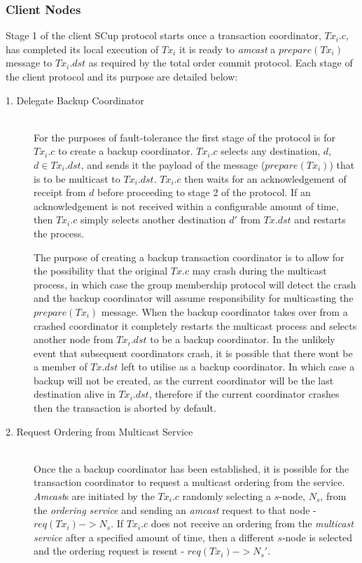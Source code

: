     \subsubsection*{Client Nodes}
    Stage 1 of the client \textsf{SCup} protocol starts once a transaction coordinator, $Tx_i.c$, has completed its local execution of $Tx_i$ it is ready to \emph{amcast} a $prepare(Tx_i)$ message to $Tx_i.dst$ as required by the total order commit protocol.  Each stage of the client protocol and its purpose are detailed below:
    \begin{description}
    
        \item[1. Delegate Backup Coordinator] \hfill \\
        For the purposes of fault-tolerance the first stage of the protocol is for $Tx_i.c$ to create a backup coordinator.  $Tx_i.c$ selects any destination, $d$, $d \in Tx_i.dst$, and sends it the payload of the message ($prepare(Tx_i)$) that is to be multicast to $Tx_i.dst$.  $Tx_i.c$ then waits for an acknowledgement of receipt from $d$ before proceeding to stage 2 of the protocol.  If an acknowledgement is not received within a configurable amount of time, then $Tx_i.c$ simply selects another destination $d'$ from $Tx.dst$ and restarts the process.  
        
        The purpose of creating a backup transaction coordinator is to allow for the possibility that the original $Tx.c$ may crash during the multicast process, in which case the group membership protocol will detect the crash and the backup coordinator will assume responsibility for multicasting the $prepare(Tx_i)$ message.  When the backup coordinator takes over from a crashed coordinator it completely restarts the multicast process and selects another node from $Tx_i.dst$ to be a backup coordinator.  In the unlikely event that subsequent coordinators crash, it is possible that there wont be a member of $Tx.dst$ left to utilise as a backup coordinator.  In which case a backup will not be created, as the current coordinator will be the last destination alive in $Tx_i.dst$, therefore if the current coordinator crashes then the transaction is aborted by default.  
                
        \item[2. Request Ordering from Multicast Service] \hfill \\
        Once the a backup coordinator has been established, it is possible for the transaction coordinator to request a multicast ordering from the service.  \emph{Amcast}s are initiated by the $Tx_i.c$ randomly selecting a $s$-node, $N_s$, from the \emph{ordering service} and sending an \emph{amcast} request to that node - $req(Tx_i) -> N_s$.  If $Tx_i.c$ does not receive an ordering from the \emph{multicast service} after a specified amount of time, then a different $s$-node is selected and the ordering request is resent - $req(Tx_i) -> N_s'$.  
        

\end{description}
